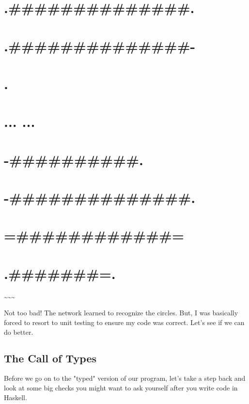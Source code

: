 \documentclass[]{article}
\begin{document}
\section{.\#\#\#\#\#\#\#\#\#\#\#\#\#\#.}

\section{.\#\#\#\#\#\#\#\#\#\#\#\#\#\#-}

\section{.}

\section{... ...}

\section{-\#\#\#\#\#\#\#\#\#\#.}

\section{-\#\#\#\#\#\#\#\#\#\#\#\#\#\#.}

\section{=\#\#\#\#\#\#\#\#\#\#\#\#=}

\section{.\#\#\#\#\#\#\#=.}

\textasciitilde{}\textasciitilde{}\textasciitilde{}

Not too bad! The network learned to recognize the circles. But, I was basically
forced to resort to unit testing to ensure my code was correct. Let's see if we
can do better.

\subsection{The Call of Types}

Before we go on to the "typed" version of our program, let's take a step back
and look at some big checks you might want to ask yourself after you write code
in Haskell.
\end{document}
